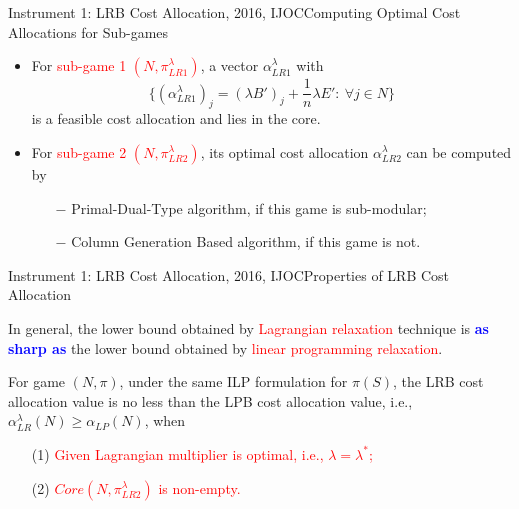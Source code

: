 \documentclass[14pt]{beamer}
\begin{document}
\begin{frame}{Instrument 1: LRB Cost Allocation, {\footnotesize 2016, IJOC}}{Computing Optimal Cost Allocations for Sub-games}
\footnotesize
\vspace{-2mm}
\begin{itemize}
\item For \textcolor{red}{sub-game 1 $(N,\pi_{LR1}^{\lambda})$}, a vector $\alpha_{LR1}^{\lambda}$ with
\begin{equation*}
\{(\alpha_{LR1}^{\lambda})_j = (\lambda B')_j + \frac{1}{n}\lambda E':~\forall j \in N \}
\end{equation*}
is a feasible cost allocation and lies in the core.

\vspace{3mm}
\item For \textcolor{red}{sub-game 2 $(N,\pi_{LR2}^{\lambda})$}, its optimal cost allocation $\alpha_{LR2}^{\lambda}$ can be computed by
\begin{itemize}
\footnotesize
\item[$-$] Primal-Dual-Type algorithm, if this game is sub-modular;\\
\vspace{2mm}
\item[$-$] Column Generation Based algorithm, if this game is not.
\end{itemize}
\end{itemize}

\end{frame}


\begin{frame}{Instrument 1: LRB Cost Allocation, {\footnotesize 2016, IJOC}}{Properties of LRB Cost Allocation}
\small
\vspace{-0.5cm}
\begin{shaded}
\centering
In general, the lower bound obtained by \textcolor{red}{Lagrangian relaxation} technique is \textcolor{blue}{\bf as sharp as} the lower bound obtained by \textcolor{red}{linear programming relaxation}.
\end{shaded}
\vspace{-0.1cm}
\begin{theorem}\label{thm:lagcostallocation1}
\rm
For game $(N,\pi)$, under the same ILP formulation for $\pi(S)$, the LRB cost allocation value is no less than the LPB cost allocation value, i.e., $\alpha_{LR}^{\lambda}(N) \geq \alpha_{LP}(N)$, when 
\begin{itemize}
\item[(1)] \textcolor{red}{Given Lagrangian multiplier is optimal, i.e., $\lambda = \lambda^*$;}
\item[(2)] \textcolor{red}{$Core(N,\pi_{LR2}^{\lambda})$ is non-empty.}
\end{itemize}
\end{theorem}
\end{frame}
\end{document}
